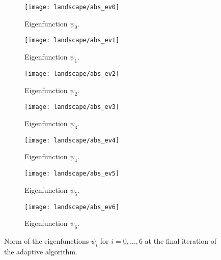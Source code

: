 \begin{figure}[htbp]
    \begin{subfigure}[t]{0.49\textwidth}
        \centering
        \texttt{[image: landscape/abs\_ev0]}
        \caption{Eigenfunction \(\psi_0\).}
        \label{fig:eigenfunction_0}
    \end{subfigure}
    \begin{subfigure}[t]{0.49\textwidth}
        \centering
        \texttt{[image: landscape/abs\_ev1]}
        \caption{Eigenfunction \(\psi_1\).}
        \label{fig:eigenfunction_1}
    \end{subfigure}
    \vspace{1cm}
    \begin{subfigure}[t]{0.49\textwidth}
        \centering
        \texttt{[image: landscape/abs\_ev2]}
        \caption{Eigenfunction \(\psi_2\).}
        \label{fig:eigenfunction_2}
    \end{subfigure}
    \begin{subfigure}[t]{0.49\textwidth}
        \centering
        \texttt{[image: landscape/abs\_ev3]}
        \caption{Eigenfunction \(\psi_3\).}
        \label{fig:eigenfunction_3}
    \end{subfigure}
    \vspace{1cm}
    \begin{subfigure}[t]{0.49\textwidth}
        \centering
        \texttt{[image: landscape/abs\_ev4]}
        \caption{Eigenfunction \(\psi_4\).}
        \label{fig:eigenfunction_4}
    \end{subfigure}
    \begin{subfigure}[t]{0.49\textwidth}
        \centering
        \texttt{[image: landscape/abs\_ev5]}
        \caption{Eigenfunction \(\psi_5\).}
        \label{fig:eigenfunction_5}
    \end{subfigure}
    \vspace{1cm}
    \begin{subfigure}[t]{0.49\textwidth}
        \centering
        \texttt{[image: landscape/abs\_ev6]}
        \caption{Eigenfunction \(\psi_6\).}
        \label{fig:eigenfunction_6}
    \end{subfigure}
    \caption{Norm of the eigenfunctions \(\psi_i\) for \(i = 0, \ldots, 6\) at the final iteration of the adaptive algorithm.}
\end{figure}


